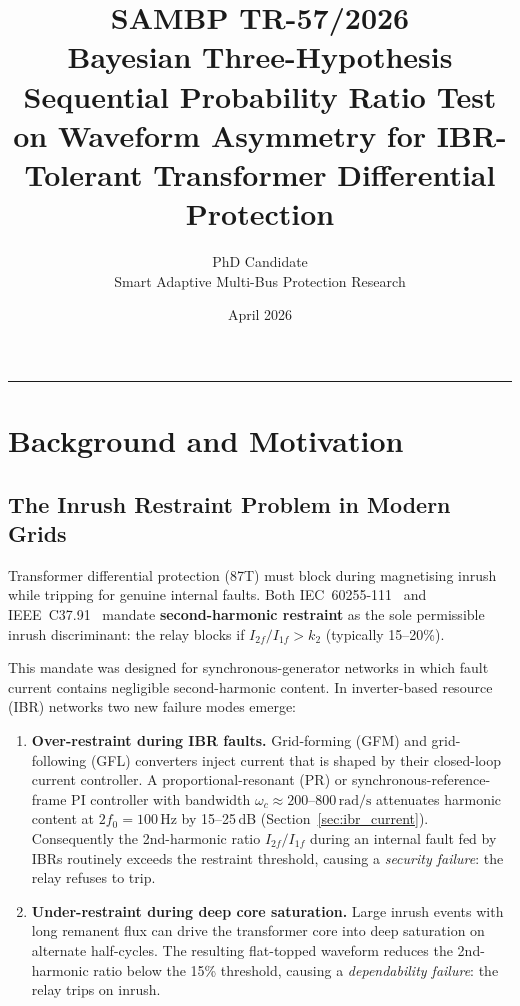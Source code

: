 \documentclass[11pt, a4paper]{article}
\title{\textbf{SAMBP TR-57/2026}\\[4pt]
       \large Bayesian Three-Hypothesis Sequential Probability Ratio Test\\
       on Waveform Asymmetry for IBR-Tolerant Transformer Differential Protection}
\author{PhD Candidate\\[2pt]
        \small Smart Adaptive Multi-Bus Protection Research}
\date{April 2026}
\begin{document}
\maketitle
\tableofcontents
\vspace{6pt}\hrule\vspace{10pt}

\section{Background and Motivation}
\label{sec:background}

\subsection{The Inrush Restraint Problem in Modern Grids}

Transformer differential protection (87T) must block during magnetising inrush
while tripping for genuine internal faults.  Both IEC~60255-111~\cite{IEC60255111}
and IEEE~C37.91~\cite{IEEEC3791} mandate \textbf{second-harmonic restraint} as the
sole permissible inrush discriminant: the relay blocks if
$I_{2f}/I_{1f} > k_{2}$ (typically 15--20\%).

This mandate was designed for synchronous-generator networks in which fault
current contains negligible second-harmonic content.  In inverter-based resource
(IBR) networks two new failure modes emerge:

\begin{enumerate}
  \item \textbf{Over-restraint during IBR faults.}  Grid-forming (GFM) and
    grid-following (GFL) converters inject current that is shaped by their
    closed-loop current controller.  A proportional-resonant (PR) or
    synchronous-reference-frame PI controller with bandwidth
    $\omega_c \approx 200$--$800\,\text{rad/s}$ attenuates harmonic content at
    $2f_0 = 100\,\text{Hz}$ by 15--25\,dB (Section~\ref{sec:ibr_current}).
    Consequently the 2nd-harmonic ratio $I_{2f}/I_{1f}$ during an internal fault
    fed by IBRs routinely exceeds the restraint threshold, causing a
    \emph{security failure}: the relay refuses to trip.

  \item \textbf{Under-restraint during deep core saturation.}  Large inrush
    events with long remanent flux can drive the transformer core into deep
    saturation on alternate half-cycles.  The resulting flat-topped waveform
    reduces the 2nd-harmonic ratio below the 15\% threshold, causing a
    \emph{dependability failure}: the relay trips on inrush.
\end{enumerate}
\end{document}
